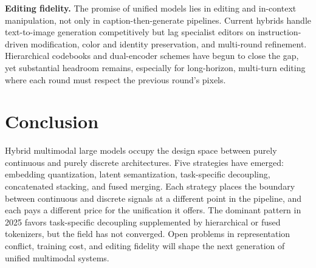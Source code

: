 \documentclass[manuscript,screen,review]{acmart}
\begin{document}
\textbf{Editing fidelity.} The promise of unified models lies in
editing and in-context manipulation, not only in caption-then-generate
pipelines. Current hybrids handle text-to-image generation
competitively but lag specialist editors on instruction-driven
modification, color and identity preservation, and multi-round
refinement. Hierarchical codebooks and dual-encoder schemes have begun
to close the gap, yet substantial headroom remains, especially for
long-horizon, multi-turn editing where each round must respect the
previous round's pixels.

\section{Conclusion}

Hybrid multimodal large models occupy the design space between purely
continuous and purely discrete architectures. Five strategies have
emerged: embedding quantization, latent semantization, task-specific
decoupling, concatenated stacking, and fused merging. Each strategy
places the boundary between continuous and discrete signals at a
different point in the pipeline, and each pays a different price for
the unification it offers. The dominant pattern in 2025 favors
task-specific decoupling supplemented by hierarchical or fused
tokenizers, but the field has not converged. Open problems in
representation conflict, training cost, and editing fidelity will
shape the next generation of unified multimodal systems.



\end{document}
